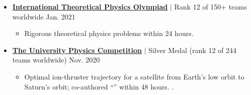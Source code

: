 \begin{itemize}[leftmargin=0.15in, label={}]
  \item \href{http://thworldcup.com/contest2021}{\textbf{International Theoretical Physics Olympiad}} $|$ Rank 12 of 150+ teams worldwide \hfill Jan. 2021
  \begin{itemize}\small
    \item Rigorous theoretical physics problems within 24 hours.
  \end{itemize}
  \item \href{http://www.uphysicsc.com/2020contest.html}{\textbf{The University Physics Competition}} $|$ Silver Medal (rank 12 of 244 teams worldwide) \hfill Nov. 2020
  \begin{itemize}\small
    \item Optimal ion-thruster trajectory for a satellite from Earth's low orbit to Saturn's orbit; co-authored ``'' within 48 hours. .
  \end{itemize}
\end{itemize}
